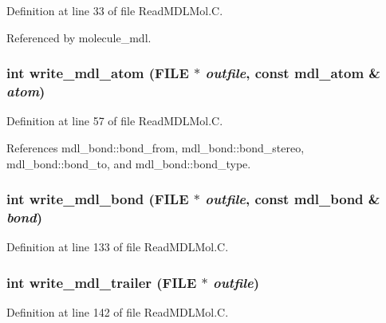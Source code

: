 Definition at line 33 of file Read\-MDLMol.C.

Referenced by molecule\_\-mdl.
\subsubsection{\setlength{\rightskip}{0pt plus 5cm}int write\_\-mdl\_\-atom (FILE $\ast$ {\em outfile}, const {\bf mdl\_\-atom} \& {\em atom})}\label{ReadMDLMol_8h_a4}




Definition at line 57 of file Read\-MDLMol.C.

References mdl\_\-bond::bond\_\-from, mdl\_\-bond::bond\_\-stereo, mdl\_\-bond::bond\_\-to, and mdl\_\-bond::bond\_\-type.
\subsubsection{\setlength{\rightskip}{0pt plus 5cm}int write\_\-mdl\_\-bond (FILE $\ast$ {\em outfile}, const {\bf mdl\_\-bond} \& {\em bond})}\label{ReadMDLMol_8h_a6}




Definition at line 133 of file Read\-MDLMol.C.
\subsubsection{\setlength{\rightskip}{0pt plus 5cm}int write\_\-mdl\_\-trailer (FILE $\ast$ {\em outfile})}\label{ReadMDLMol_8h_a7}




Definition at line 142 of file Read\-MDLMol.C.